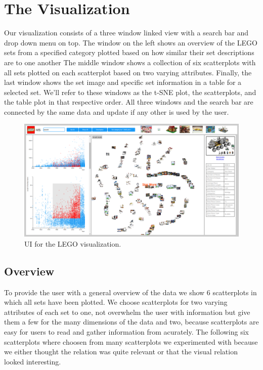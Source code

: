\documentclass[a4paper, 12pt]{article}
\begin{document}
\section*{The Visualization}

Our visualization consists of a three window linked view with a search bar and drop down menu on top. The window on the left shows an overview of the LEGO sets from a specified category plotted based on how similar their set descriptions are to one another The middle window shows a collection of six scatterplots with all sets plotted on each scatterplot based on two varying attributes. Finally, the last window shows the set image and specific set information in a table for a selected set. We'll refer to these windows as the t-SNE plot, the scatterplots, and the table plot in that respective order. All three windows and the search bar are connected by the same data and update if any other is used by the user.

\begin{figure}[h!]
\centering
\includegraphics[width=1.0\textwidth]{img/lego-vis-screenshot.png}
\caption{UI for the LEGO visualization.}

\end{figure}

\subsection*{Overview}

To provide the user with a general overview of the data we show 6 scatterplots in which all sets have been plotted. We choose scatterplots for two varying attributes of  each set to one, not overwhelm the user with information but give them a few for the many dimensions of the data and two, because scatterplots are easy for users to read and gather information from acurately. The following six scatterplots where choosen from many scatterplots we experimented with because we either thought the relation was quite relevant or that the visual relation looked interesting. \\
\end{document}
